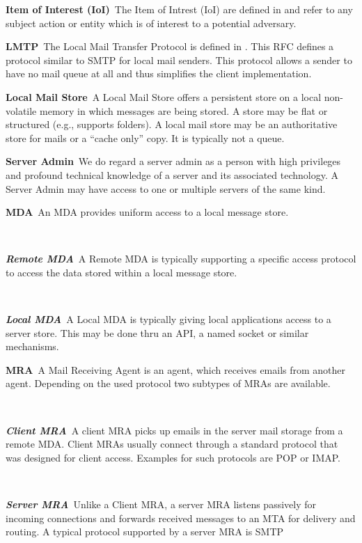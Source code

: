 \documentclass[a4paper,appendixprefix,pdfusetitle,twocolumn,fontsize=8pt,DIV=calc,8pt,draft]{\doctype} %
\newenvironment{entry}{\par\leavevmode\hangpara{1.5mm}{1}\ignorespaces}{\RaggedRight\par}
\newcommand*{\mainentry}[2]{{\bfseries{#1\label{def:#1}}}~#2\par}
\newcommand*{\subentry}[2]{\par~\begin{minipage}{\columnwidth-0.6cm}{\bfseries{\itshape{#1\label{def:#1}}}}~#2\end{minipage}}
\begin{document}
\begin{entry}
	\mainentry{Item of Interest (IoI)}{The Item of Intrest (IoI) are defined in \cite{anonTerminology} and refer to any subject action or entity which is of interest to a potential adversary.}
\end{entry}

\begin{entry}
	\mainentry{LMTP}{The Local Mail Transfer Protocol is defined in \cite{RFC2033}. This RFC defines a protocol similar to SMTP for local mail senders. This protocol allows a sender to have no mail queue at all and thus simplifies the client implementation.}
\end{entry}

\begin{entry}
	\mainentry{Local Mail Store}{A Local Mail Store offers a persistent store on a local non-volatile memory in which messages are being stored. A store may be flat or structured (e.g., supports folders). A local mail store may be an authoritative store for mails or a ``cache only'' copy. It is typically not a queue.}
\end{entry}

\begin{entry}
	\mainentry{Server Admin}{We do regard a server admin as a person with high privileges and profound technical knowledge of a server and its associated technology. A Server Admin may have access to one or multiple servers of the same kind.}
\end{entry}

\begin{entry}
	\mainentry{MDA}{An MDA provides uniform access to a local message store.}
	\subentry{Remote MDA}{A Remote MDA is typically supporting a specific access protocol to access the data stored within a local message store.}
	\subentry{Local MDA}{A Local MDA is typically giving local applications access to a server store. This may be done thru an API, a named socket or similar mechanisms.}
\end{entry}

\begin{entry}
	\mainentry{MRA}{A Mail Receiving Agent is an agent, which receives emails from another agent. Depending on the used protocol two subtypes of MRAs are available.}
	\subentry{Client MRA}{A client MRA picks up emails in the server mail storage from a remote MDA. Client MRAs usually connect through a standard protocol that was designed for client access. Examples for such protocols are POP or IMAP.}
	\subentry{Server MRA}{Unlike a Client MRA, a server MRA listens passively for incoming connections and forwards received messages to an MTA for delivery and routing. A typical protocol supported by a server MRA is SMTP}
\end{entry}
\end{document}
